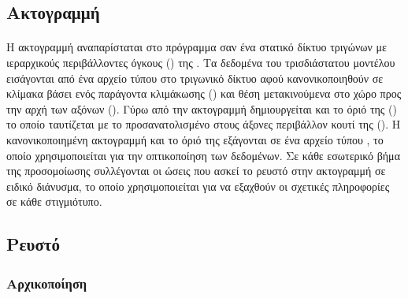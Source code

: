 \subsection{Ακτογραμμή}
\paragraph{} Η ακτογραμμή αναπαρίσταται στο πρόγραμμα σαν ένα στατικό δίκτυο τριγώνων με
ιεραρχικούς περιβάλλοντες όγκους () της . Τα δεδομένα
του τρισδιάστατου μοντέλου εισάγονται από ένα αρχείο τύπου  στο τριγωνικό δίκτυο
αφού κανονικοποιηθούν σε κλίμακα βάσει ενός παράγοντα κλιμάκωσης ()
και θέση μετακινούμενα στο χώρο προς την αρχή των αξόνων (). Γύρω από την
ακτογραμμή δημιουργείται και το όριό της () το οποίο ταυτίζεται με
το προσανατολισμένο στους άξονες περιβάλλον κουτί της (). Η κανονικοποιημένη
ακτογραμμή και το όριό της εξάγονται σε ένα αρχείο τύπου , το οποίο
χρησιμοποιείται για την οπτικοποίηση των δεδομένων. Σε κάθε εσωτερικό βήμα της
προσομοίωσης συλλέγονται οι ώσεις που ασκεί το ρευστό στην ακτογραμμή σε ειδικό διάνυσμα,
το οποίο χρησιμοποιείται για να εξαχθούν οι σχετικές πληροφορίες σε κάθε στιγμιότυπο.

\subsection{Ρευστό}
\subsubsection{Αρχικοποίηση}
\label{sssec:fluid-init}
